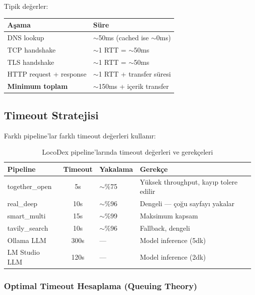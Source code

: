 \noindent
Tipik de\u{g}erler:
\begin{center}
\begin{tabular}{ll}
\toprule
\color{chapterBlue}\textbf{A\c{s}ama} & \color{chapterBlue}\textbf{S\"{u}re} \\
\midrule
DNS lookup & $\sim$50ms (cached ise $\sim$0ms) \\
TCP handshake & $\sim$1 RTT = $\sim$50ms \\
TLS handshake & $\sim$1 RTT = $\sim$50ms \\
HTTP request + response & $\sim$1 RTT + transfer s\"{u}resi \\
\midrule
\textbf{Minimum toplam} & $\sim$150ms + i\c{c}erik transfer \\
\bottomrule
\end{tabular}
\end{center}


\subsection{Timeout Stratejisi}
\label{subsec:timeout}

Farkl{\i} pipeline'lar farkl{\i} timeout de\u{g}erleri kullan{\i}r:

\begin{table}[H]
\centering
\caption{LocoDex pipeline'lar{\i}nda timeout de\u{g}erleri ve gerek\c{c}eleri}
\label{tab:search-timeouts}
\begin{tabularx}{\textwidth}{lclX}
\toprule
\color{chapterBlue}\textbf{Pipeline} &
\color{chapterBlue}\textbf{Timeout} &
\color{chapterBlue}\textbf{Yakalama} &
\color{chapterBlue}\textbf{Gerek\c{c}e} \\
\midrule
together\_open   & 5s  & $\sim$\%75 & Y\"{u}ksek throughput, kay{\i}p tolere edilir \\
real\_deep       & 10s & $\sim$\%96 & Dengeli --- \c{c}o\u{g}u sayfay{\i} yakalar \\
smart\_multi     & 15s & $\sim$\%99 & Maksimum kapsam \\
tavily\_search   & 10s & $\sim$\%96 & Fallback, dengeli \\
Ollama LLM       & 300s & ---       & Model inference (5dk) \\
LM Studio LLM    & 120s & ---       & Model inference (2dk) \\
\bottomrule
\end{tabularx}
\end{table}

\subsubsection{Optimal Timeout Hesaplama (Queuing Theory)}

